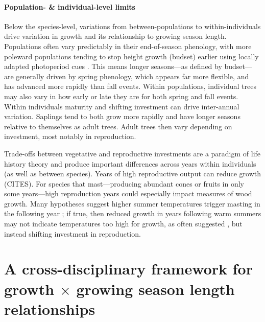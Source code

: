\documentclass[11pt]{article}
\begin{document}
\paragraph{Population- \& individual-level limits}
Below the species-level, variations from between-populations to within-individuals drive variation in growth and its relationship to growing season length. Populations often vary predictably in their end-of-season phenology, with more poleward populations tending to stop height growth (budset) earlier using locally adapted photoperiod cues . This means longer seasons---as defined by budset---are generally driven by spring phenology, which appears far more flexible, and has advanced more rapidly than fall events. Within populations, individual trees may also vary in how early or late they are for both spring and fall events. Within individuals maturity and shifting investment can drive inter-annual variation. Saplings tend to both grow more rapidly and have longer seasons relative to themselves as adult trees. Adult trees then vary depending on investment, most notably in reproduction. 

Trade-offs between vegetative and reproductive investments are a paradigm of life history theory and produce important differences across years within individuals (as well as between species). Years of high reproductive output can reduce growth (CITES). For species that mast---producing abundant cones or fruits in only some years---high reproduction years could especially impact measures of wood growth. Many hypotheses suggest higher summer temperatures trigger masting in the following year \citep{hacket2016tree,hacket2016consistent}; if true, then reduced growth in years following warm summers may not indicate temperatures too high for growth, as often suggested \citep[e.g.,][]{gantois2022new,dow2022warm}, but instead shifting investment in reproduction.

\section*{A cross-disciplinary framework for growth $\times$ growing season length relationships}
 
\end{document}
